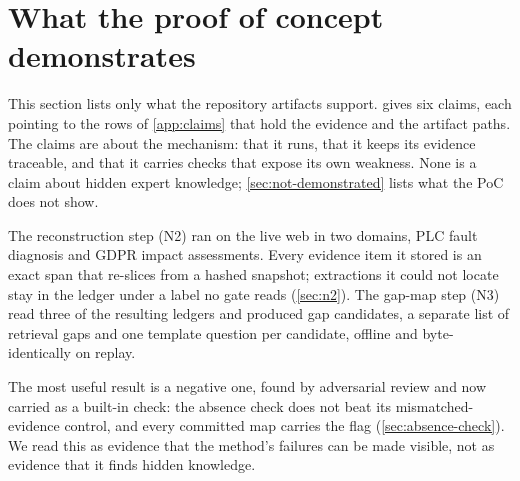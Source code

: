 \section{What the proof of concept demonstrates}\label{sec:demonstrates}

This section lists only what the repository artifacts support.  gives six
claims, each pointing to the rows of \cref{app:claims} that hold the evidence and the artifact
paths. The claims are about the mechanism: that it runs, that it keeps its evidence traceable, and
that it carries checks that expose its own weakness. None is a claim about hidden expert knowledge;
\cref{sec:not-demonstrated} lists what the PoC does not show.

\evobs{} The reconstruction step (N2) ran on the live web in two domains, PLC fault diagnosis and
GDPR impact assessments. Every evidence item it stored is an exact span that re-slices from a hashed
snapshot; extractions it could not locate stay in the ledger under a label no gate reads
(\cref{sec:n2}). The gap-map step (N3) read three of the resulting ledgers and produced gap
candidates, a separate list of retrieval gaps and one template question per candidate, offline and
byte-identically on replay.

\evobs{} The most useful result is a negative one, found by adversarial review and now carried as a
built-in check: the absence check does not beat its mismatched-evidence control, and every committed map carries
the  flag (\cref{sec:absence-check}). \evint{} We read this as evidence
that the method's failures can be made visible, not as evidence that it finds hidden knowledge.

